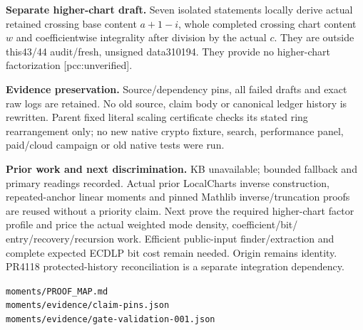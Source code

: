 \documentclass[10pt]{article}
\begin{document}
\textbf{Separate higher-chart draft.} Seven isolated statements locally
derive actual retained crossing base content $a+1-i$, whole completed crossing
chart content $w$ and coefficientwise integrality after division by the actual
$c$. They are outside this43/44 audit/fresh, unsigned data310194. They provide
no higher-chart factorization [pcc:unverified].

\textbf{Evidence preservation.} Source/dependency pins, all failed drafts
and exact raw logs are retained. No old source, claim body or canonical ledger
history is rewritten. Parent fixed literal scaling certificate checks its
stated ring rearrangement only; no new native crypto fixture, search,
performance panel, paid/cloud campaign or old native tests were run.

\textbf{Prior work and next discrimination.} KB unavailable; bounded fallback
and primary readings recorded. Actual prior LocalCharts inverse construction,
repeated-anchor linear moments and pinned Mathlib inverse/truncation proofs
are reused without a priority claim. Next prove the required higher-chart
factor profile and price the actual weighted mode density, coefficient/bit/
entry/recovery/recursion work. Efficient public-input finder/extraction and
complete expected ECDLP bit cost remain needed. Origin remains identity.
PR4118 protected-history reconciliation is a separate integration dependency.

{\small\texttt{moments/PROOF\_MAP.md}\\
\texttt{moments/evidence/claim-pins.json}\\
\texttt{moments/evidence/gate-validation-001.json}}
\end{document}
